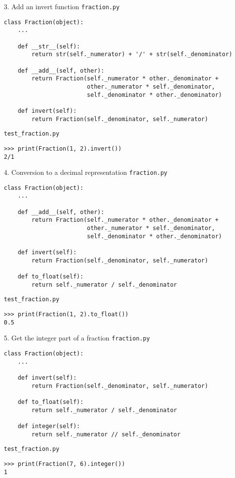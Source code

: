 \documentclass{beamer}
\begin{document}
\begin{frame}[fragile]{3. Add an invert function}
\small
\texttt{fraction.py}
\begin{verbatim}
class Fraction(object):
    ...

    def __str__(self):
        return str(self._numerator) + '/' + str(self._denominator)

    def __add__(self, other):
        return Fraction(self._numerator * other._denominator +
                        other._numerator * self._denominator,
                        self._denominator * other._denominator)

    def invert(self):
        return Fraction(self._denominator, self._numerator)
\end{verbatim}

\vfill

\texttt{test\_fraction.py}
\begin{verbatim}
>>> print(Fraction(1, 2).invert())
2/1
\end{verbatim}
\end{frame}

\begin{frame}[fragile]{4. Conversion to a decimal representation}
\small
\texttt{fraction.py}
\begin{verbatim}
class Fraction(object):
    ...

    def __add__(self, other):
        return Fraction(self._numerator * other._denominator +
                        other._numerator * self._denominator,
                        self._denominator * other._denominator)

    def invert(self):
        return Fraction(self._denominator, self._numerator)

    def to_float(self):
        return self._numerator / self._denominator
\end{verbatim}

\vfill

\texttt{test\_fraction.py}
\begin{verbatim}
>>> print(Fraction(1, 2).to_float())
0.5
\end{verbatim}
\end{frame}

\begin{frame}[fragile]{5. Get the integer part of a fraction}
\small
\texttt{fraction.py}
\begin{verbatim}
class Fraction(object):
    ...

    def invert(self):
        return Fraction(self._denominator, self._numerator)

    def to_float(self):
        return self._numerator / self._denominator

    def integer(self):
        return self._numerator // self._denominator
\end{verbatim}

\vfill

\texttt{test\_fraction.py}
\begin{verbatim}
>>> print(Fraction(7, 6).integer())
1
\end{verbatim}
\end{frame}
\end{document}
